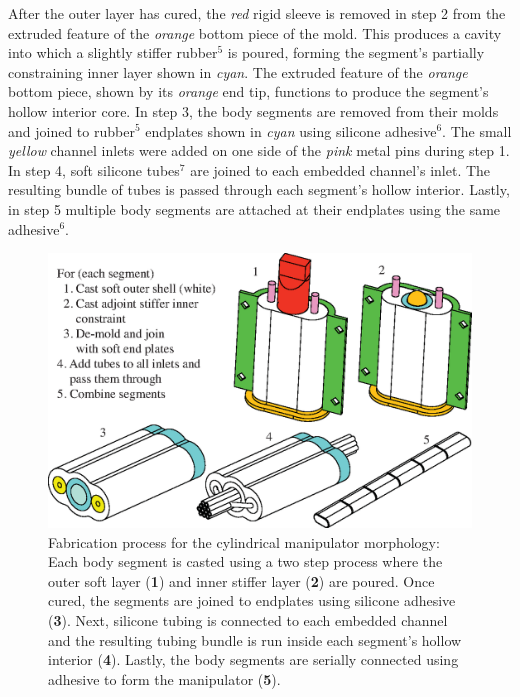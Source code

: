 After the outer layer has cured, the \emph{red} rigid sleeve is removed in step 2 from the extruded feature of the \emph{orange} bottom piece of the mold.
This produces a cavity into which a slightly stiffer rubber$^5$ is poured, forming the segment's partially constraining inner layer shown in \emph{cyan}.
The extruded feature of the \emph{orange} bottom piece, shown by its \emph{orange} end tip, functions to produce the segment's hollow interior core.
In step 3, the body segments are removed from their molds and joined to rubber$^5$ endplates shown in \emph{cyan} using silicone adhesive$^6$.
The small \emph{yellow} channel inlets were added on one side of the \emph{pink} metal pins during step 1.
In step 4, soft silicone tubes$^7$ are joined to each embedded channel's inlet.
The resulting bundle of tubes is passed through each segment's hollow interior.
Lastly, in step 5 multiple body segments are attached at their endplates using the same adhesive$^6$.

\begin{figure}[htb]
\centering
\includegraphics[width=\columnwidth]{figures/fabrication/fab_cylindrical_process.eps}
\caption[Fabrication process for the cylindrical manipulator morphology]{Fabrication process for the cylindrical manipulator morphology: Each body segment is casted using a two step process where the outer soft layer (\textbf{1}) and inner stiffer layer (\textbf{2}) are poured. Once cured, the segments are joined to endplates using silicone adhesive (\textbf{3}). Next, silicone tubing is connected to each embedded channel and the resulting tubing bundle is run inside each segment's hollow interior (\textbf{4}). Lastly, the body segments are serially connected using adhesive to form the manipulator (\textbf{5}).}
\label{fig:cylindrical_fab}
\end{figure}


